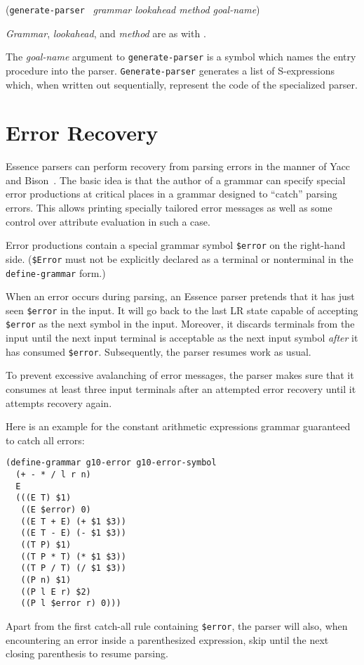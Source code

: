 \documentclass{article}
\renewcommand{\var}[1]{\noindent\mbox{\textit{#1}}}
\newcommand{\ide}[1]{{\frenchspacing\textnormal{\texttt{#1}}}}
\newcommand{\pproto}[2]{\unskip%
\mbox{\texonly{\spaceskip=0.5em}#1}%
\mbox{ }\texonly{\nobreak}\htmlonly{ }\textrm{#2}}
\newcommand{\proto}[3]{\par\bigskip\begin{flushleft}\pproto{(\texttt{#1}}{\textit{#2})}\hspace*{\fill}{#3}\end{flushleft}}
\newcommand{\codefont}[1]{\texttt{#1}}
\begin{document}
\proto{generate-parser}{grammar lookahead method goal-name}{procedure}
%
\var{Grammar}, \var{lookahead}, and \var{method} are as with
\link{\codefont{parse}}{proc:parse}.

The \var{goal-name} argument to \ide{generate-parser} is a symbol
which names the entry procedure into the parser.
\ide{Generate-parser} generates a list of S-expressions which, when
written out sequentially, represent the code of the specialized
parser.

\section{Error Recovery}
\label{sec:error-recovery}

Essence parsers can perform recovery from parsing errors in the manner
of Yacc~\cite{Johnson1975} and Bison~\cite{DonnellyStallman1995}.  The
basic idea is that the author of a grammar can specify special
error productions at critical places in a grammar designed to ``catch''
parsing errors.  This allows printing specially tailored error
messages as well as some control over attribute evaluation in such a
case.

Error productions contain a special grammar symbol \codefont{\$error}
on the right-hand side.  (\codefont{\$Error} must not be explicitly
declared as a terminal or nonterminal in the \codefont{define-grammar}
form.)

When an error occurs during parsing, an Essence parser pretends that
it has just seen \codefont{\$error} in the input.  It will go back to
the last LR state capable of accepting \codefont{\$error} as the next
symbol in the input.  Moreover, it discards terminals from the input
until the next input terminal is acceptable as the next input symbol
\emph{after} it has consumed \codefont{\$error}.  Subsequently, the
parser resumes work as usual.

To prevent excessive avalanching of error messages, the parser makes
sure that it consumes at least three input terminals after an
attempted error recovery until it attempts recovery again.

Here is an example for the constant arithmetic expressions grammar
guaranteed to catch all errors:
%
\begin{verbatim}
(define-grammar g10-error g10-error-symbol
  (+ - * / l r n)
  E
  (((E T) $1)
   ((E $error) 0)
   ((E T + E) (+ $1 $3))
   ((E T - E) (- $1 $3))
   ((T P) $1)
   ((T P * T) (* $1 $3))
   ((T P / T) (/ $1 $3))
   ((P n) $1)
   ((P l E r) $2)
   ((P l $error r) 0)))
\end{verbatim}
%
Apart from the first catch-all rule containing \codefont{\$error}, the
parser will also, when encountering an error inside a parenthesized
expression, skip until the next closing parenthesis to resume parsing.
\end{document}
